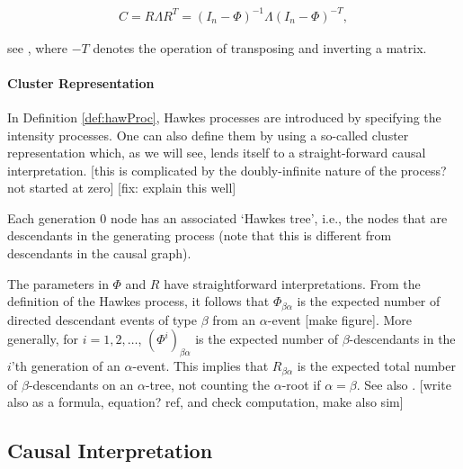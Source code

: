 \documentclass[accepted]{uai2021} %
\begin{document}
\begin{align}
	C = R \Lambda R^T = (I_n - \Phi)^{-1}\Lambda(I_n - \Phi)^{-T},
	\label{eq:covarEq}
\end{align}


see \cite{jovanovic2015}, where $-T$ denotes the operation of transposing and 
inverting a matrix.


\paragraph{Cluster Representation}

In Definition \ref{def:hawProc}, Hawkes processes are introduced by specifying 
the intensity processes. One can also define them by using a so-called cluster 
representation which, as we will see, lends itself to a straight-forward causal 
interpretation. [this is complicated by the doubly-infinite nature of the 
process? not started at zero] [fix: explain this well]

Each 
generation 0 node has an associated `Hawkes tree', i.e., the nodes that are 
descendants in the generating process (note that this is different from 
descendants in the causal graph).

The parameters in $\Phi$ and $R$ have straightforward interpretations. From the 
definition of the Hawkes process, it follows that $\Phi_{\beta\alpha}$ is the 
expected number of directed descendant events of type $\beta$ from an 
$\alpha$-event [make figure]. More generally, for $i = 1,2,\ldots$, 
$(\Phi^i)_{\beta\alpha}$ is the 
expected number of $\beta$-descendants in the $i$'th generation of an 
$\alpha$-event. This implies that $R_{\beta\alpha}$ is the expected total 
number of $\beta$-descendants on an $\alpha$-tree, not counting the 
$\alpha$-root if $\alpha=\beta$. 
See also 
\cite{jovanovic2015}.
[write also as a formula, 
equation? ref, and check computation, make also sim]





\subsection{Causal Interpretation}
\end{document}
